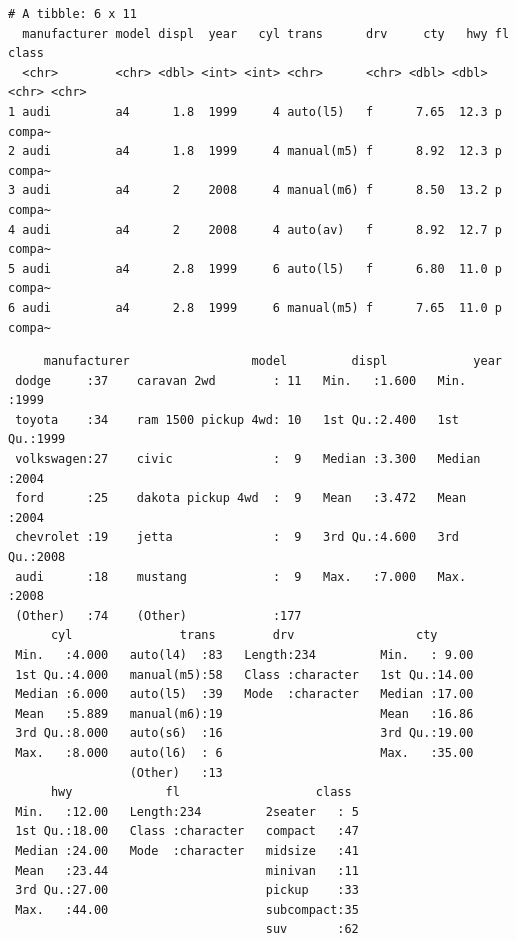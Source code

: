 \documentclass[
  11pt,
]{krantz}
\newenvironment{Shaded}{\begin{snugshade}}{\end{snugshade}}
\newcommand{\CommentTok}[1]{\textcolor[rgb]{0.37,0.37,0.37}{\textit{#1}}}
\newcommand{\KeywordTok}[1]{\textcolor[rgb]{0.27,0.27,0.27}{\textbf{#1}}}
\newcommand{\NormalTok}[1]{#1}
\newcommand{\OperatorTok}[1]{\textcolor[rgb]{0.43,0.43,0.43}{\textbf{#1}}}
\newcommand{\StringTok}[1]{\textcolor[rgb]{0.5,0.5,0.5}{#1}}
\begin{document}
\begin{verbatim}
# A tibble: 6 x 11
  manufacturer model displ  year   cyl trans      drv     cty   hwy fl    class 
  <chr>        <chr> <dbl> <int> <int> <chr>      <chr> <dbl> <dbl> <chr> <chr> 
1 audi         a4      1.8  1999     4 auto(l5)   f      7.65  12.3 p     compa~
2 audi         a4      1.8  1999     4 manual(m5) f      8.92  12.3 p     compa~
3 audi         a4      2    2008     4 manual(m6) f      8.50  13.2 p     compa~
4 audi         a4      2    2008     4 auto(av)   f      8.92  12.7 p     compa~
5 audi         a4      2.8  1999     6 auto(l5)   f      6.80  11.0 p     compa~
6 audi         a4      2.8  1999     6 manual(m5) f      7.65  11.0 p     compa~
\end{verbatim}

\begin{Shaded}
\end{Shaded}

\begin{verbatim}
     manufacturer                 model         displ            year     
 dodge     :37    caravan 2wd        : 11   Min.   :1.600   Min.   :1999  
 toyota    :34    ram 1500 pickup 4wd: 10   1st Qu.:2.400   1st Qu.:1999  
 volkswagen:27    civic              :  9   Median :3.300   Median :2004  
 ford      :25    dakota pickup 4wd  :  9   Mean   :3.472   Mean   :2004  
 chevrolet :19    jetta              :  9   3rd Qu.:4.600   3rd Qu.:2008  
 audi      :18    mustang            :  9   Max.   :7.000   Max.   :2008  
 (Other)   :74    (Other)            :177                                 
      cyl               trans        drv                 cty       
 Min.   :4.000   auto(l4)  :83   Length:234         Min.   : 9.00  
 1st Qu.:4.000   manual(m5):58   Class :character   1st Qu.:14.00  
 Median :6.000   auto(l5)  :39   Mode  :character   Median :17.00  
 Mean   :5.889   manual(m6):19                      Mean   :16.86  
 3rd Qu.:8.000   auto(s6)  :16                      3rd Qu.:19.00  
 Max.   :8.000   auto(l6)  : 6                      Max.   :35.00  
                 (Other)   :13                                     
      hwy             fl                   class   
 Min.   :12.00   Length:234         2seater   : 5  
 1st Qu.:18.00   Class :character   compact   :47  
 Median :24.00   Mode  :character   midsize   :41  
 Mean   :23.44                      minivan   :11  
 3rd Qu.:27.00                      pickup    :33  
 Max.   :44.00                      subcompact:35  
                                    suv       :62  
\end{verbatim}
\end{document}
